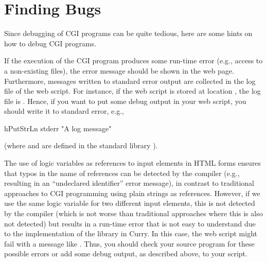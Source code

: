 \section{Finding Bugs}

Since debugging of CGI programs can be quite tedious,
here are some hints on how to debug CGI programs.

If the execution of the CGI program produces some run-time error
(e.g., access to a non-existing files), the error message
should be shown in the web page.
Furthermore, messages written to standard error output
are collected in the log file of the web script.
For instance, if the web script is stored at location
,
the log file is .
Hence, if you want to put some debug output in your web script,
you should write it to standard error, e.g.,
%
\begin{curry}
hPutStrLn stderr "A log message"
\end{curry}
%
(where  and  are defined
in the standard library ).


The use of logic variables as references to input elements
in HTML forms ensures that typos in the name of references
can be detected by the compiler (e.g., resulting in an
``undeclared identifier'' error message), in contrast
to traditional approaches to CGI programming using plain strings
as references.
However, if we use the same logic variable for two different
input elements, this is not detected by the compiler
(which is not worse than traditional approaches where this
is also not detected) but results in a run-time error
that is not easy to understand due to the implementation
of the library  in Curry.
In this case, the web script might fail with a message like
.
Thus, you should check your source program for these possible errors
or add some debug output, as described above, to your script.


